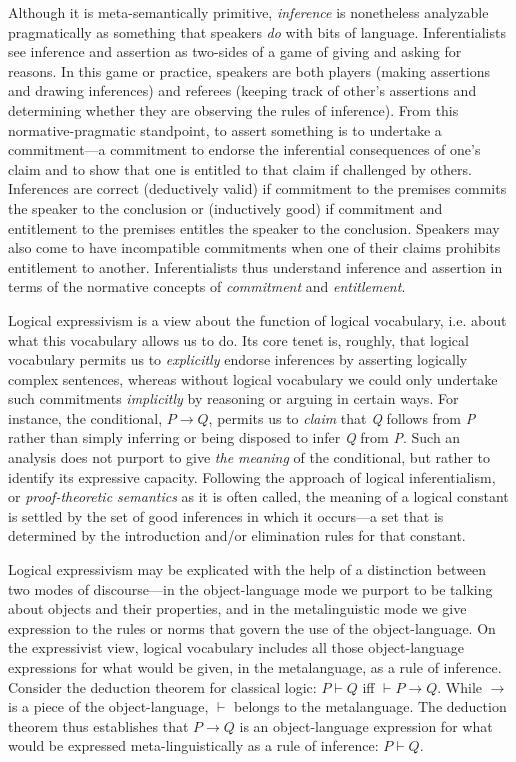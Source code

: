 \documentclass{article}
\begin{document}
Although it is meta-semantically primitive, \textit{inference} is nonetheless analyzable pragmatically as something that speakers \textit{do} with bits of language. Inferentialists see inference and assertion as two-sides of a game of giving and asking for reasons. In this game or practice, speakers are both players (making assertions and drawing inferences) and referees (keeping track of other's assertions and determining whether they are observing the rules of inference). From this normative-pragmatic standpoint, to assert something is to undertake a commitment---a commitment to endorse the inferential consequences of one's claim and to show that one is entitled to that claim if challenged by others. Inferences are correct (deductively valid) if commitment to the premises commits the speaker to the conclusion or (inductively good) if commitment and entitlement to the premises entitles the speaker to the conclusion. Speakers may also come to have incompatible commitments when one of their claims prohibits entitlement to another. Inferentialists thus understand inference and assertion in terms of the normative concepts of \textit{commitment} and \textit{entitlement}.
	
Logical expressivism is a view about the function of logical vocabulary, i.e. about what this vocabulary allows us to do. Its core tenet is, roughly, that logical vocabulary permits us to \textit{explicitly} endorse inferences by asserting logically complex sentences, whereas without logical vocabulary we could only undertake such commitments \textit{implicitly} by reasoning or arguing in certain ways. For instance, the conditional, $ P  \rightarrow  Q$, permits us to \textit{claim} that \textit{Q} follows from \textit{P} rather than simply inferring or being disposed to infer \textit{Q} from \textit{P}. Such an analysis does not purport to give \textit{the meaning} of the conditional, but rather to identify its expressive capacity. Following the approach of logical inferentialism, or \textit{proof-theoretic semantics} as it is often called, the meaning of a logical constant is settled by the set of good inferences in which it occurs---a set that is determined by the introduction and/or elimination rules for that constant.

Logical expressivism may be explicated with the help of a distinction between two modes of discourse---in the object-language mode we purport to be talking about objects and their properties, and in the metalinguistic mode we give expression to the rules or norms that govern the use of the object-language. On the expressivist view, logical vocabulary includes all those object-language expressions for what would be given, in the metalanguage, as a rule of inference. Consider the deduction theorem for classical logic: $ P \vdash Q $ iff $ \vdash P \rightarrow Q $. While $ \rightarrow $ is a piece of the object-language, $ \vdash $ belongs to the metalanguage. The deduction theorem thus establishes that $ P \rightarrow Q $ is an object-language expression for what would be expressed meta-linguistically as a rule of inference: $ P \vdash Q $.
\end{document}
